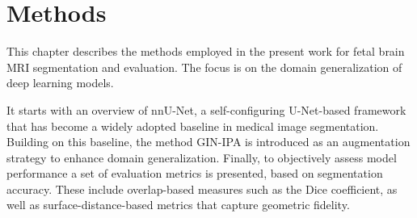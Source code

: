 \chapter{Methods} \label{chap:Methods}
\vspace{1cm}

This chapter describes the methods employed in the present work for fetal brain MRI segmentation and evaluation. The focus is on the domain generalization of deep learning models.

It starts with an overview of nnU-Net, a self-configuring U-Net-based framework that has become a widely adopted baseline in medical image segmentation. Building on this baseline, the method GIN-IPA is introduced as an augmentation strategy to enhance domain generalization. Finally, to objectively assess model performance a set of evaluation metrics is presented, based on segmentation accuracy. These include overlap-based measures such as the Dice coefficient, as well as surface-distance-based metrics that capture geometric fidelity.

